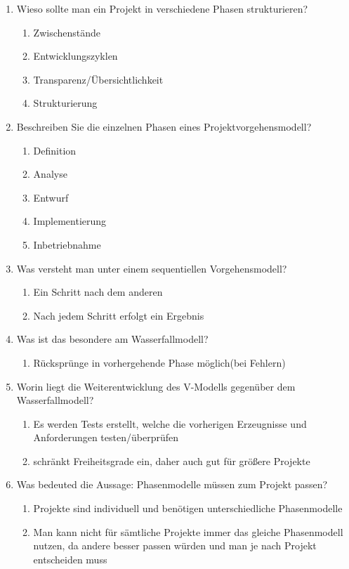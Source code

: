 \documentclass[12pt,a4paper]{article}
\begin{document}
\begin{enumerate}
\begin{enumerate}
	\end{enumerate}
	\item Wieso sollte man ein Projekt in verschiedene Phasen strukturieren?
	\begin{enumerate}
		\item Zwischenstände
		\item Entwicklungszyklen
		\item Transparenz/Übersichtlichkeit
		\item Strukturierung
	\end{enumerate}
	\item Beschreiben Sie die einzelnen Phasen eines Projektvorgehensmodell?
	\begin{enumerate}
		\item Definition
		\item Analyse
		\item Entwurf
		\item Implementierung
		\item Inbetriebnahme
	\end{enumerate}
	\item Was versteht man unter einem sequentiellen Vorgehensmodell?
	\begin{enumerate}
		\item Ein Schritt nach dem anderen
		\item Nach jedem Schritt erfolgt ein Ergebnis
	\end{enumerate}
	\item Was ist das besondere am Wasserfallmodell?
	\begin{enumerate}
		\item Rücksprünge in vorhergehende Phase möglich(bei Fehlern)
	\end{enumerate}
	\item Worin liegt die Weiterentwicklung des V-Modells gegenüber dem Wasserfallmodell?
	\begin{enumerate}
		\item Es werden Tests erstellt, welche die vorherigen Erzeugnisse und Anforderungen testen/überprüfen
		\item schränkt Freiheitsgrade ein, daher auch gut für größere Projekte
	\end{enumerate}
	\item Was bedeuted die Aussage: Phasenmodelle müssen zum Projekt passen?
	\begin{enumerate}
		\item Projekte sind individuell und benötigen unterschiedliche Phasenmodelle
		\item Man kann nicht für sämtliche Projekte immer das gleiche Phasenmodell nutzen, da andere besser passen würden und man je nach Projekt entscheiden muss

\end{enumerate}
\end{enumerate}
\end{document}
